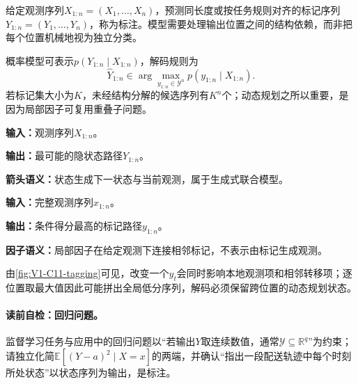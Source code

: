 \begin{definition}[序列标注]
给定观测序列$X_{1:n}=(X_1,\ldots,X_n)$，预测同长度或按任务规则对齐的标记序列$Y_{1:n}=(Y_1,\ldots,Y_n)$，称为标注。模型需要处理输出位置之间的结构依赖，而非把每个位置机械地视为独立分类。
\end{definition}

概率模型可表示$p(Y_{1:n}\mid X_{1:n})$，解码规则为
\[
\widehat Y_{1:n}\in
\arg\max_{y_{1:n}\in\mathcal Y^n}p(y_{1:n}\mid X_{1:n}).
\]
若标记集大小为$K$，未经结构分解的候选序列有$K^n$个；动态规划之所以重要，是因为局部因子可复用重叠子问题。

\label{struct:V1-C11-CH17}
\begin{center}
\begin{minipage}[t]{0.47\linewidth}
\begin{keypointbox}[title=HMM任务卡]
\textbf{输入：}观测序列$X_{1:n}$。\par
\textbf{输出：}最可能的隐状态路径$Y_{1:n}$。\par
\textbf{箭头语义：}状态生成下一状态与当前观测，属于生成式联合模型。
\end{keypointbox}
\end{minipage}\hfill
\begin{minipage}[t]{0.47\linewidth}
\begin{keypointbox}[title=CRF任务卡]
\textbf{输入：}完整观测序列$x_{1:n}$。\par
\textbf{输出：}条件得分最高的标记路径$y_{1:n}$。\par
\textbf{因子语义：}局部因子在给定观测下连接相邻标记，不表示由标记生成观测。
\end{keypointbox}
\end{minipage}
\end{center}

由\cref{fig:V1-C11-tagging}可见，改变一个$y_t$会同时影响本地观测项和相邻转移项；逐位置取最大值因此可能拼出全局低分序列，解码必须保留跨位置的动态规划状态。


\paragraph{读前自检：回归问题。}监督学习任务与应用中的回归问题以“若输出$Y$取连续数值，通常$\mathcal Y\subseteq\mathbb R^q$”为约束；请独立化简$\mathbb E[(Y-a)^2\mid X=x]$的两端，并确认“指出一段配送轨迹中每个时刻所处状态”以状态序列为输出，是标注。\par

